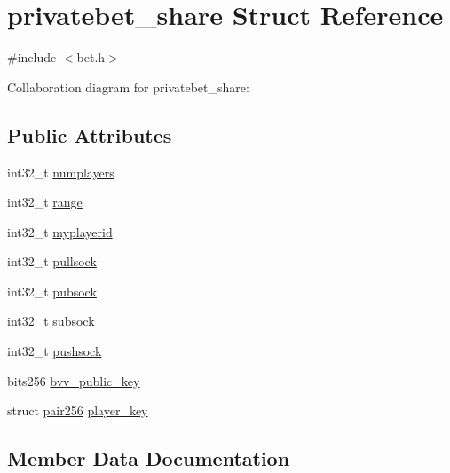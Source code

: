 \hypertarget{structprivatebet__share}{}\section{privatebet\+\_\+share Struct Reference}
\label{structprivatebet__share}


{\ttfamily \#include $<$bet.\+h$>$}



Collaboration diagram for privatebet\+\_\+share\+:
\subsection*{Public Attributes}
\begin{DoxyCompactItemize}
\item 
int32\+\_\+t \hyperlink{structprivatebet__share_a68fd85a4a8e37ea44874f539eae7b351}{numplayers}
\item 
int32\+\_\+t \hyperlink{structprivatebet__share_a3cf44241e4e8ce86848648d66dae414a}{range}
\item 
int32\+\_\+t \hyperlink{structprivatebet__share_a7ed135d259a8397ff4d14873d2a3eee9}{myplayerid}
\item 
int32\+\_\+t \hyperlink{structprivatebet__share_aae07563369523806f9ac464dba5a0213}{pullsock}
\item 
int32\+\_\+t \hyperlink{structprivatebet__share_add6af3c7c7347f299ba30405ebd4ebc0}{pubsock}
\item 
int32\+\_\+t \hyperlink{structprivatebet__share_a4214acb498a8560837dea48ee40a2746}{subsock}
\item 
int32\+\_\+t \hyperlink{structprivatebet__share_af3be21301f453b7db1c634ac4edfe1ce}{pushsock}
\item 
bits256 \hyperlink{structprivatebet__share_ac6419dd53a9675112380945ecc31df2d}{bvv\+\_\+public\+\_\+key}
\item 
struct \hyperlink{structpair256}{pair256} \hyperlink{structprivatebet__share_a890a65950223041a020fe0dd905c6991}{player\+\_\+key}
\end{DoxyCompactItemize}


\subsection{Member Data Documentation}
\mbox{\label{structprivatebet__share_ac6419dd53a9675112380945ecc31df2d}} 
